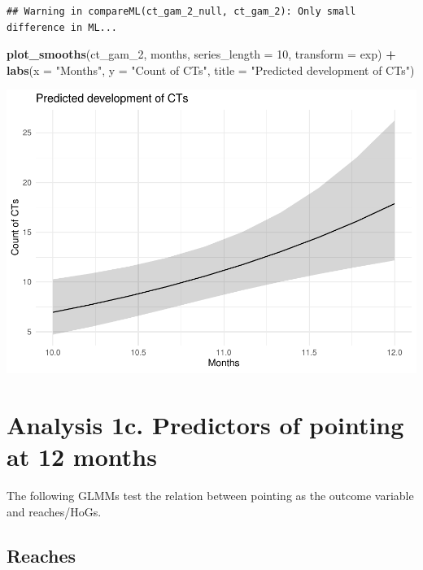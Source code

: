 \documentclass[]{article}
\newenvironment{Shaded}{\begin{snugshade}}{\end{snugshade}}
\newcommand{\DataTypeTok}[1]{\textcolor[rgb]{0.13,0.29,0.53}{#1}}
\newcommand{\DecValTok}[1]{\textcolor[rgb]{0.00,0.00,0.81}{#1}}
\newcommand{\KeywordTok}[1]{\textcolor[rgb]{0.13,0.29,0.53}{\textbf{#1}}}
\newcommand{\NormalTok}[1]{#1}
\newcommand{\OperatorTok}[1]{\textcolor[rgb]{0.81,0.36,0.00}{\textbf{#1}}}
\newcommand{\StringTok}[1]{\textcolor[rgb]{0.31,0.60,0.02}{#1}}
\begin{document}
\begin{verbatim}
## Warning in compareML(ct_gam_2_null, ct_gam_2): Only small difference in ML...
\end{verbatim}

\begin{Shaded}
\begin{Highlighting}[]
\KeywordTok{plot_smooths}\NormalTok{(ct_gam_}\DecValTok{2}\NormalTok{, months, }\DataTypeTok{series_length =} \DecValTok{10}\NormalTok{, }\DataTypeTok{transform =}\NormalTok{ exp) }\OperatorTok{+}
\StringTok{  }\KeywordTok{labs}\NormalTok{(}\DataTypeTok{x =} \StringTok{"Months"}\NormalTok{, }\DataTypeTok{y =} \StringTok{"Count of CTs"}\NormalTok{, }\DataTypeTok{title =} \StringTok{"Predicted development of CTs"}\NormalTok{)}
\end{Highlighting}
\end{Shaded}

\includegraphics{supplement_files/figure-latex/ct-gam-2-plot-1.pdf}

\newpage

\hypertarget{analysis-1c.-predictors-of-pointing-at-12-months}{%
\section{Analysis 1c. Predictors of pointing at 12
months}\label{analysis-1c.-predictors-of-pointing-at-12-months}}

The following GLMMs test the relation between pointing as the outcome
variable and reaches/HoGs.

\hypertarget{reaches}{%
\subsection{Reaches}\label{reaches}}
\end{document}

